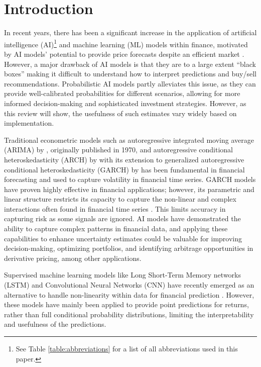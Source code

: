 \section{Introduction}
\label{sec:introduction}
In recent years, there has been a significant increase in the application of artificial intelligence (AI)\footnote{See Table \ref{table:abbreviations} for a list of all abbreviations used in this paper.
} and machine learning (ML) models within finance, motivated by AI models' potential to provide price forecasts despite an efficient market \textcite{sezer2020financial}. However, a major drawback of AI models is that they are to a large extent ``black boxes'' making it difficult to understand how to interpret predictions and buy/sell recommendations. Probabilistic AI models partly alleviates this issue, as they can provide well-calibrated probabilities for different scenarios, allowing for more informed decision-making and sophisticated investment strategies. However, as this review will show, the usefulness of such estimates vary widely based on implementation.

Traditional econometric models such as autoregressive integrated moving average (ARIMA) by \textcite{boxJenkins2016time}, originally published in 1970, and autoregressive conditional heteroskedasticity (ARCH) by \textcite{Engle1982ARCH} with its extension to generalized autoregressive conditional heteroskedasticity (GARCH) by \textcite{BOLLERSLEV1986GARCH} has been fundamental in financial forecasting and used to capture volatility in financial time series. GARCH models have proven highly effective in financial applications; however, its parametric and linear structure restricts its capacity to capture the non-linear and complex interactions often found in financial time series \parencite{sezer2020financial}. This limits accuracy in capturing risk as some signals are ignored. AI models have demonstrated the ability to capture complex patterns in financial data, and applying these capabilities to enhance uncertainty estimates could be valuable for improving decision-making, optimizing portfolios, and identifying arbitrage opportunities in derivative pricing, among other applications.

Supervised machine learning models like Long Short-Term Memory networks (LSTM) and Convolutional Neural Networks (CNN) have recently emerged as an alternative to handle non-linearity within data for financial prediction \parencite{Tang2022Survey}. However, these models have mainly been applied to provide point predictions for returns, rather than full conditional probability distributions, limiting the interpretability and usefulness of the predictions.

